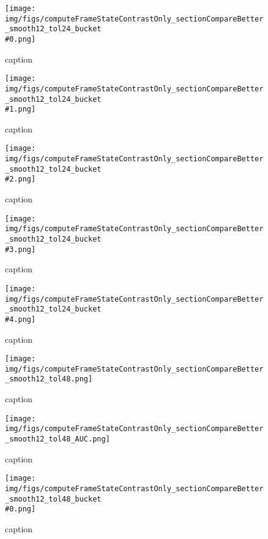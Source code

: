%
\begin{figure}[!ht]
	\centering
	\texttt{[image: img/figs/computeFrameStateContrastOnly\_sectionCompareBetter\_smooth12\_tol24\_bucket\\\#0.png]}
	\caption{caption}
	\label{fig:computeFrameStateContrastOnly_sectionCompareBetter_smooth12_tol24_bucket\#0.png}
\end{figure}
%
\begin{figure}[!ht]
	\centering
	\texttt{[image: img/figs/computeFrameStateContrastOnly\_sectionCompareBetter\_smooth12\_tol24\_bucket\\\#1.png]}
	\caption{caption}
	\label{fig:computeFrameStateContrastOnly_sectionCompareBetter_smooth12_tol24_bucket\#1.png}
\end{figure}
%
\begin{figure}[!ht]
	\centering
	\texttt{[image: img/figs/computeFrameStateContrastOnly\_sectionCompareBetter\_smooth12\_tol24\_bucket\\\#2.png]}
	\caption{caption}
	\label{fig:computeFrameStateContrastOnly_sectionCompareBetter_smooth12_tol24_bucket\#2.png}
\end{figure}
%
\begin{figure}[!ht]
	\centering
	\texttt{[image: img/figs/computeFrameStateContrastOnly\_sectionCompareBetter\_smooth12\_tol24\_bucket\\\#3.png]}
	\caption{caption}
	\label{fig:computeFrameStateContrastOnly_sectionCompareBetter_smooth12_tol24_bucket\#3.png}
\end{figure}
%
\begin{figure}[!ht]
	\centering
	\texttt{[image: img/figs/computeFrameStateContrastOnly\_sectionCompareBetter\_smooth12\_tol24\_bucket\\\#4.png]}
	\caption{caption}
	\label{fig:computeFrameStateContrastOnly_sectionCompareBetter_smooth12_tol24_bucket\#4.png}
\end{figure}
%
\begin{figure}[!ht]
	\centering
	\texttt{[image: img/figs/computeFrameStateContrastOnly\_sectionCompareBetter\_smooth12\_tol48.png]}
	\caption{caption}
	\label{fig:computeFrameStateContrastOnly_sectionCompareBetter_smooth12_tol48.png}
\end{figure}
%
\begin{figure}[!ht]
	\centering
	\texttt{[image: img/figs/computeFrameStateContrastOnly\_sectionCompareBetter\_smooth12\_tol48\_AUC.png]}
	\caption{caption}
	\label{fig:computeFrameStateContrastOnly_sectionCompareBetter_smooth12_tol48_AUC.png}
\end{figure}
%
\begin{figure}[!ht]
	\centering
	\texttt{[image: img/figs/computeFrameStateContrastOnly\_sectionCompareBetter\_smooth12\_tol48\_bucket\\\#0.png]}
	\caption{caption}
	\label{fig:computeFrameStateContrastOnly_sectionCompareBetter_smooth12_tol48_bucket\#0.png}
\end{figure}
